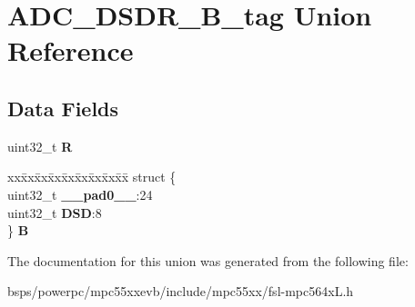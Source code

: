 \hypertarget{unionADC__DSDR__32B__tag}{}\section{A\+D\+C\+\_\+\+D\+S\+D\+R\+\_\+B\+\_\+tag Union Reference}
\label{unionADC__DSDR__32B__tag}
\subsection*{Data Fields}
\begin{DoxyCompactItemize}
\item 
\mbox{\label{unionADC__DSDR__32B__tag_a5ff02f2ea3c5aa04e3e2def819efe677}} 
uint32\+\_\+t {\bfseries R}
\item 
\mbox{\label{unionADC__DSDR__32B__tag_af0377acbe3f66be0929bc685e95f70d5}} 
\begin{tabbing}
xx\=xx\=xx\=xx\=xx\=xx\=xx\=xx\=xx\=\kill
struct \{\\
\>uint32\_t {\bfseries \_\_pad0\_\_}:24\\
\>uint32\_t {\bfseries DSD}:8\\
\} {\bfseries B}\\

\end{tabbing}\end{DoxyCompactItemize}


The documentation for this union was generated from the following file\+:\begin{DoxyCompactItemize}
\item 
bsps/powerpc/mpc55xxevb/include/mpc55xx/fsl-\/mpc564x\+L.\+h\end{DoxyCompactItemize}
